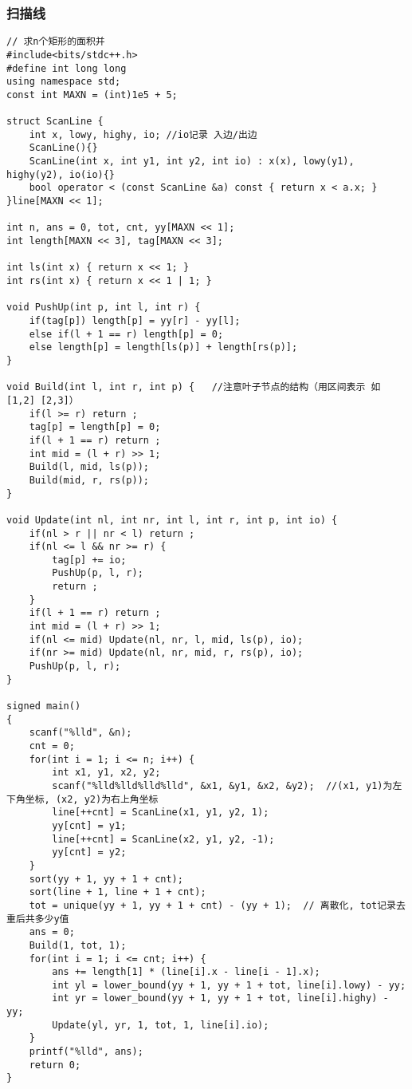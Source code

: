 \subsubsection{扫描线}
\begin{lstlisting}
// 求n个矩形的面积并
#include<bits/stdc++.h>
#define int long long
using namespace std;
const int MAXN = (int)1e5 + 5;

struct ScanLine {
	int x, lowy, highy, io;	//io记录 入边/出边 
	ScanLine(){}
	ScanLine(int x, int y1, int y2, int io) : x(x), lowy(y1), highy(y2), io(io){}
	bool operator < (const ScanLine &a) const { return x < a.x; }
}line[MAXN << 1];

int n, ans = 0, tot, cnt, yy[MAXN << 1];
int length[MAXN << 3], tag[MAXN << 3];

int ls(int x) { return x << 1; }
int rs(int x) { return x << 1 | 1; }

void PushUp(int p, int l, int r) {
	if(tag[p]) length[p] = yy[r] - yy[l];
	else if(l + 1 == r) length[p] = 0;
	else length[p] = length[ls(p)] + length[rs(p)];
}

void Build(int l, int r, int p) {	//注意叶子节点的结构（用区间表示 如[1,2] [2,3]） 
	if(l >= r) return ;
	tag[p] = length[p] = 0;
	if(l + 1 == r) return ;
	int mid = (l + r) >> 1;
	Build(l, mid, ls(p));
	Build(mid, r, rs(p));
}

void Update(int nl, int nr, int l, int r, int p, int io) {
	if(nl > r || nr < l) return ;
	if(nl <= l && nr >= r) {
		tag[p] += io;
		PushUp(p, l, r);
		return ;
	}
	if(l + 1 == r) return ;
	int mid = (l + r) >> 1;
	if(nl <= mid) Update(nl, nr, l, mid, ls(p), io);
	if(nr >= mid) Update(nl, nr, mid, r, rs(p), io);
	PushUp(p, l, r);
}

signed main()
{
	scanf("%lld", &n);
	cnt = 0;
	for(int i = 1; i <= n; i++) {
		int x1, y1, x2, y2;
		scanf("%lld%lld%lld%lld", &x1, &y1, &x2, &y2);	//(x1, y1)为左下角坐标, (x2, y2)为右上角坐标 
		line[++cnt] = ScanLine(x1, y1, y2, 1);
		yy[cnt] = y1;
		line[++cnt] = ScanLine(x2, y1, y2, -1);
		yy[cnt] = y2;
	}
	sort(yy + 1, yy + 1 + cnt);
	sort(line + 1, line + 1 + cnt);
	tot = unique(yy + 1, yy + 1 + cnt) - (yy + 1);	// 离散化, tot记录去重后共多少y值 
	ans = 0;
	Build(1, tot, 1);
	for(int i = 1; i <= cnt; i++) {
		ans += length[1] * (line[i].x - line[i - 1].x);
		int yl = lower_bound(yy + 1, yy + 1 + tot, line[i].lowy) - yy;
		int yr = lower_bound(yy + 1, yy + 1 + tot, line[i].highy) - yy;
		Update(yl, yr, 1, tot, 1, line[i].io);
	} 
	printf("%lld", ans);
	return 0;
}
\end{lstlisting}

